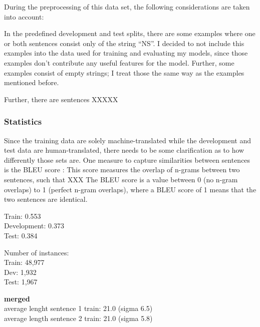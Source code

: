 During the preprocessing of this data set, the following considerations are taken into account:

In the predefined development and test splits, there are some examples where one or both sentences 
consist
only of the string ``NS''.
I decided to not include this examples into the data used for training and evaluating my models, 
since
those examples don't contribute any useful features for the model.
Further, some examples consist of empty strings; I treat those the same way as the examples 
mentioned before.

Further, there are sentences XXXXX

\subsubsection{Statistics}

Since the training data are solely machine-translated while the development and test data are 
human-translated, there needs to be some clarification as to how differently those sets are.
One measure to capture similarities between sentences is the BLEU score \cite{papineni2002bleu}:
This score measures the overlap of n-grams between two sentences, such that XXX
The BLEU score is a value between 0 (no n-gram overlaps) to 1 (perfect n-gram overlaps), where a 
BLEU score of 1 means that the two sentences are identical.



Train: 0.553 \\
Development: 0.373 \\
Test: 0.384

Number of instances: \\
Train: 48,977 \\
Dev: 1,932 \\
Test: 1,967

\textbf{merged} \\
average lenght sentence 1 train: 21.0 (sigma 6.5) \\
average length sentence 2 train: 21.0 (sigma 5.8)

